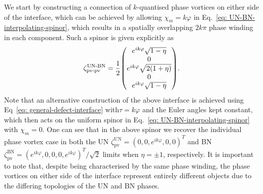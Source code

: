 We start by constructing a connection of \(k\)-quantised phase vortices on
either side of the interface, which can be achieved by allowing
\(\chi_m=k\varphi\) in Eq.~\eqref{eq: UN-BN-interpolating-spinor}, which results
in a spatially overlapping \(2k\pi \) phase winding in each component.
Such a spinor is given explicitly as
\begin{align}\label{eq: UN-BN-SQV-SQV}
    \zeta_\text{pv-pv}^\text{UN-BN} =
    \frac{1}{2}\mqty(
        e^{ik\varphi}\sqrt{1-\eta} \\
        0 \\
        e^{ik\varphi}\sqrt{2(1+\eta)} \\
        0 \\
        e^{ik\varphi}\sqrt{1-\eta}
    ).
\end{align}
Note that an alternative construction of the above interface is achieved using
Eq~\eqref{eq: general-defect-interface} with\(\tau=k\varphi \) and the Euler
angles kept constant, which then acts on the uniform spinor in
Eq.~\eqref{eq: UN-BN-interpolating-spinor} with \(\chi_m=0\).
One can see that in the above spinor we recover the individual phase vortex
case in both the UN \(\zeta^\text{UN}_\text{pv} = {(0,0,e^{ik\varphi},0,0)}^T\)
and BN \(\zeta^\mathrm{BN}_\text{pv} =
{(e^{ik\varphi},0,0,0,e^{ik\varphi})}^T/\sqrt{2}\) limits when \(\eta = \pm 1\),
respectively.
It is important to note that, despite being characterised by the same phase
winding, the phase vortices on either side of the interface represent entirely
different objects due to the differing topologies of the UN and BN phases.

